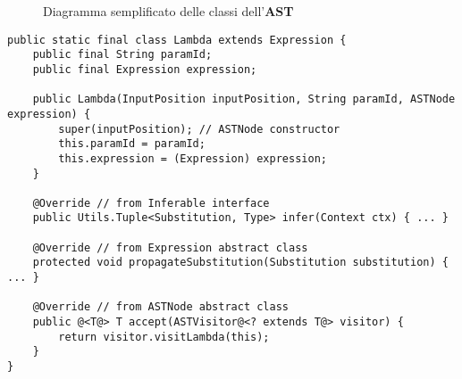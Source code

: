 \begin{figure}
    \caption{Diagramma semplificato delle classi dell'\textbf{AST}}
    \label{fig:5-5-ast-classes}
    \vspace{4mm}
\end{figure}

\begin{lstlisting}[caption={Esempio di classe della gerarchia dell'\textbf{AST}}, style=javaCode, label={lst:5-5-ast-class-java}]
public static final class Lambda extends Expression {
    public final String paramId;
    public final Expression expression;

    public Lambda(InputPosition inputPosition, String paramId, ASTNode expression) {
        super(inputPosition); // ASTNode constructor
        this.paramId = paramId;
        this.expression = (Expression) expression;
    }

    @Override // from Inferable interface
    public Utils.Tuple<Substitution, Type> infer(Context ctx) { ... }

    @Override // from Expression abstract class
    protected void propagateSubstitution(Substitution substitution) { ... }

    @Override // from ASTNode abstract class
    public @<T@> T accept(ASTVisitor@<? extends T@> visitor) {
        return visitor.visitLambda(this);
    }
}
\end{lstlisting}

